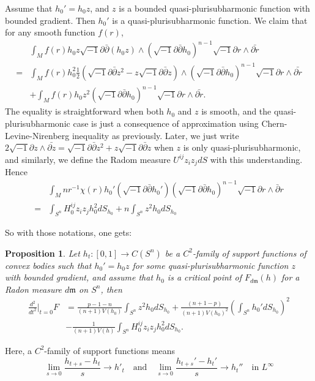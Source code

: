 \documentclass[reqno]{amsart}
\theoremstyle{remark}
\theoremstyle{plain}
\newtheorem{prop}[thm]{Proposition}
\newcommand{\ddc}{\sqrt{-1}\partial\bar\partial}
\begin{document}
Assume that $h_0'=h_0z$, and $z$ is a bounded quasi-plurisubharmonic function with bounded gradient. Then $h_0'$ is a quasi-plurisubharmonic function.  We claim that for any smooth function $f(r)$, \[\begin{aligned}
    &\int_{M}f(r)h_0z\ddc (h_0z)\wedge(\ddc h_0)^{n-1}\sqrt{-1}\partial r\wedge\bar{\partial r}\\
    =&\int_Mf(r)h_0^2\frac{1}{2}(\ddc z^2-z\ddc z)\wedge(\ddc h_0)^{n-1}\sqrt{-1}\partial r\wedge\bar{\partial r}\\
    &+\int_M f(r)h_0z^2(\ddc h_0)^{n-1}\sqrt{-1}\partial r\wedge\bar{\partial r}.
\end{aligned}
\]The equality is straightforward when both $h_0$ and $z$ is smooth, and the quasi-plurisubharmonic case is just a consequence of approximation using Chern-Levine-Nirenberg inequality as previously. Later, we just write $2\sqrt{-1}\partial z\wedge\bar{\partial z}=\ddc z^2+z\ddc z$ when $z$ is only quasi-plurisubharmonic, and similarly, we define the Radom measure $U^{ij}z_iz_jdS$ with this understanding. Hence  \[\begin{aligned}
    &\int_M nr^{-1}\chi(r)h_0'(\ddc h_0')(\ddc h_0)^{n-1}\sqrt{-1}\partial r\wedge \bar{\partial}r\\
=&\int_{S^n}H_0^{ij}z_iz_jh_0^2dS_{h_0}+n\int_{S^n}z^2h_0dS_{h_0}
\end{aligned} \]

So with those notations,  one gets:\begin{prop}
    Let $h_t:[0,1]\to C(S^n)$ be a $C^2$-family of support functions of convex bodies such that $h_0'=h_0z$ for some quasi-plurisubharmonic function $z$ with bounded gradient, and assume that $h_0$ is a critical point of $F_{d\mathfrak{m}}(h)$ for a Radon measure $d\mathfrak{m}$ on $S^n$, then \begin{equation}
\begin{aligned}\label{nonsmoothsvf}
    \frac{d^2}{dt^2}|_{t=0}F&=\frac{p-1-n}{(n+1)V(h_0)}\int_{S^n}z^2h_0dS_{h_0}+\frac{(n+1-p)}{(n+1)V(h_0)^2}\left(\int_{S^n}h_0'dS_{h_0}\right)^2\\
    &-\frac{1}{(n+1)V(h)}\int_{S^n}H_0^{ij}z_iz_jh_0^2dS_{h_0}.
\end{aligned}
\end{equation}
\end{prop}
Here, a $C^2$-family of support functions means \[
\lim_{s\rightarrow0}\frac{h_{t+s}-h_t}{s}\to h'_t  \quad \text{and} \quad \lim_{s\rightarrow0}\frac{h_{t+s}'-h_t'}{s}\to  h_t'' \quad \text{in } L^\infty\]
\end{document}
